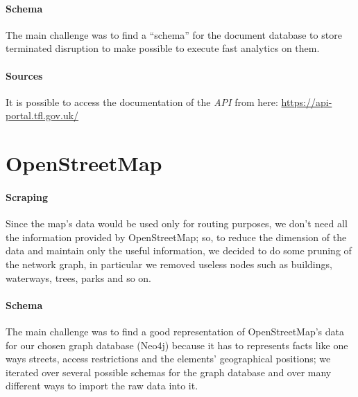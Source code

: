 
\paragraph{Schema}
The main challenge was to find a ``schema'' for the document database to store
terminated disruption to make possible to execute fast analytics on them.

\paragraph{Sources}
It is possible to access the documentation of the \textit{API} from here:
\url{https://api-portal.tfl.gov.uk/}

\section{OpenStreetMap}

\paragraph{Scraping}
Since the map’s data would be used only for routing purposes, we don’t need all 
the information provided by OpenStreetMap; so, to reduce the dimension of the 
data and maintain only the useful information, we decided to do some pruning of 
the network graph, in particular we removed useless nodes such as buildings, 
waterways, trees, parks and so on.

\paragraph{Schema}
The main challenge was to find a good representation of OpenStreetMap’s data 
for our chosen graph database (Neo4j) because it has to represents facts like 
one ways streets, access restrictions and the elements' geographical positions;
we iterated over several possible schemas for the graph database and over many
different ways to import the raw data into it.


